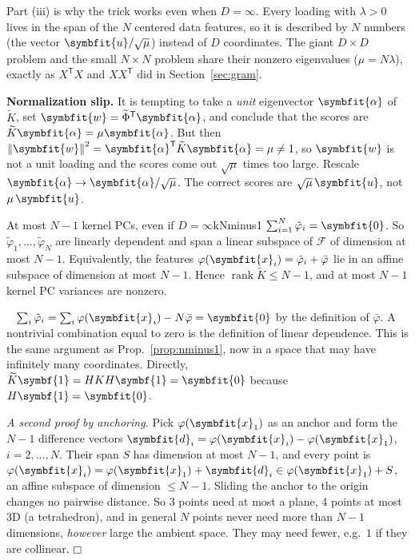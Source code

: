 \documentclass[11pt]{article}
\newcommand{\bm}[1]{\symbfit{#1}}
\newenvironment{proofsketch}{\par\noindent{\itshape Proof.}\ }{\hfill$\mdlgwhtsquare$\par}
\newcommand{\vx}{\bm{x}}
\newcommand{\vw}{\bm{w}}
\newcommand{\vu}{\bm{u}}
\newcommand{\one}{\symbf{1}}
\newcommand{\T}{^{\mathsf T}}
\newcommand{\rank}{\operatorname{rank}}
\newcommand{\norm}[1]{\left\lVert #1\right\rVert}
\begin{document}
\begin{intuition}
Part (iii) is why the trick works even when $D=\infty$. Every loading with $\lambda>0$
lives in the span of the $N$ centered data features, so it is described by $N$ numbers
(the vector $\vu/\sqrt\mu$) instead of $D$ coordinates. The giant $D\times D$ problem and
the small $N\times N$ problem share their nonzero eigenvalues ($\mu=N\lambda$), exactly as
$X\T X$ and $XX\T$ did in Section~\ref{sec:gram}.
\end{intuition}

\begin{careful}
\textbf{Normalization slip.} It is tempting to take a \emph{unit} eigenvector $\bm\alpha$ of
$\widetilde K$, set $\vw=\widetilde\Phi\T\bm\alpha$, and conclude that the scores are
$\widetilde K\bm\alpha=\mu\bm\alpha$. But then $\norm{\vw}^2=\bm\alpha\T\widetilde K\bm\alpha=\mu\neq1$,
so $\vw$ is not a unit loading and the scores come out $\sqrt\mu$ times too large. Rescale
$\bm\alpha\to\bm\alpha/\sqrt\mu$. The correct scores are $\sqrt{\mu}\,\vu$, not $\mu\,\vu$.
\end{careful}

\begin{proposition}{At most $N-1$ kernel PCs, even if $D=\infty$}{kNminus1}
$\sum_{i=1}^N\tilde\varphi_i=\bm 0$. So $\tilde\varphi_1,\dots,\tilde\varphi_N$ are linearly
dependent and span a linear subspace of $\mathcal F$ of dimension at most $N-1$. Equivalently,
the features $\varphi(\vx_i)=\tilde\varphi_i+\bar{\varphi}$ lie in an affine subspace of dimension at most $N-1$.
Hence $\rank\widetilde K\le N-1$, and at most $N-1$ kernel PC variances are nonzero.
\end{proposition}
\begin{proofsketch}
$\sum_i\tilde\varphi_i=\sum_i\varphi(\vx_i)-N\bar{\varphi}=\bm0$ by the definition of $\bar{\varphi}$. A
nontrivial combination equal to zero is the definition of linear dependence. This is the same argument
as Prop.~\ref{prop:nminus1}, now in a space that may have infinitely many coordinates.
Directly, $\widetilde K\one=HKH\one=\bm0$ because $H\one=\bm0$.

\emph{A second proof by anchoring.} Pick $\varphi(\vx_1)$ as an anchor and form the $N-1$ difference
vectors $\bm d_i=\varphi(\vx_i)-\varphi(\vx_1)$, $i=2,\dots,N$. Their span $S$ has dimension at most $N-1$,
and every point is $\varphi(\vx_i)=\varphi(\vx_1)+\bm d_i\in\varphi(\vx_1)+S$, an affine subspace of dimension
$\le N-1$. Sliding the anchor to the origin changes no pairwise distance. So 3 points need at most a
plane, 4 points at most 3D (a tetrahedron), and in general $N$ points never need more than $N-1$
dimensions, \emph{however} large the ambient space. They may need fewer, e.g.\ $1$ if they are collinear.
\end{proofsketch}
\end{document}
